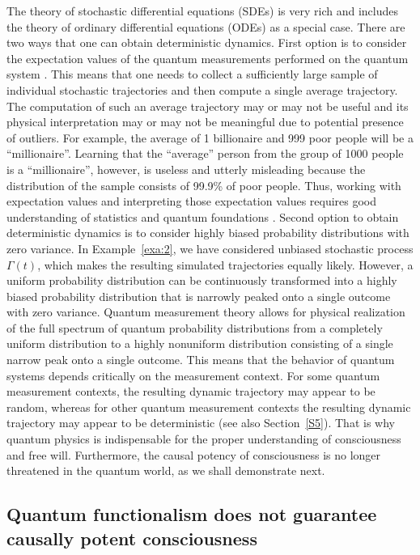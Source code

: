 \documentclass{ws-ijmpb}
\begin{document}
The theory of stochastic differential equations (SDEs) is very rich
and includes the theory of ordinary differential equations (ODEs)
as a special case. There are two ways that one can obtain deterministic
dynamics. First option is to consider the expectation values of the
quantum measurements performed on the quantum system \cite{Georgiev2019,Georgiev2020d,Georgiev2022,Georgiev2022b}.
This means that one needs to collect a sufficiently large sample of
individual stochastic trajectories and then compute a single average
trajectory. The computation of such an average trajectory may or may
not be useful and its physical interpretation may or may not be meaningful due to potential presence of outliers.
For example, the average of 1 billionaire and 999 poor people will
be a ``millionaire''. Learning that the ``average''
person from the group of 1000 people is a ``millionaire'',
however, is useless and utterly misleading because the distribution
of the sample consists of 99.9\% of poor people. Thus, working with
expectation values and interpreting those expectation values requires
good understanding of statistics \cite{Huff1993} and quantum foundations
\cite{Gudder1988}. Second option to obtain deterministic dynamics
is to consider highly biased probability distributions with zero variance.
In Example~\ref{exa:2}, we have considered unbiased stochastic process $\Gamma(t)$,
which makes the resulting simulated trajectories equally likely. However,
a uniform probability distribution can be continuously transformed
into a highly biased probability distribution that is narrowly peaked
onto a single outcome with zero variance. Quantum measurement theory \cite{vonNeumann1955,Busch1996} allows for physical
realization of the full spectrum of quantum probability distributions
from a completely uniform distribution to a highly nonuniform distribution
consisting of a single narrow peak onto a single outcome. This means
that the behavior of quantum systems depends critically on the measurement
context. For some quantum measurement contexts, the resulting dynamic
trajectory may appear to be random, whereas for other quantum measurement
contexts the resulting dynamic trajectory may appear to be deterministic \cite{Georgiev2021} (see also Section~\ref{S5}).
That is why quantum physics is indispensable for the proper understanding
of consciousness and free will.
Furthermore, the causal potency of consciousness is no longer threatened in the quantum world,
as we shall demonstrate next.

\subsection{Quantum functionalism does not guarantee causally potent consciousness}
\label{sub:41}
\end{document}
